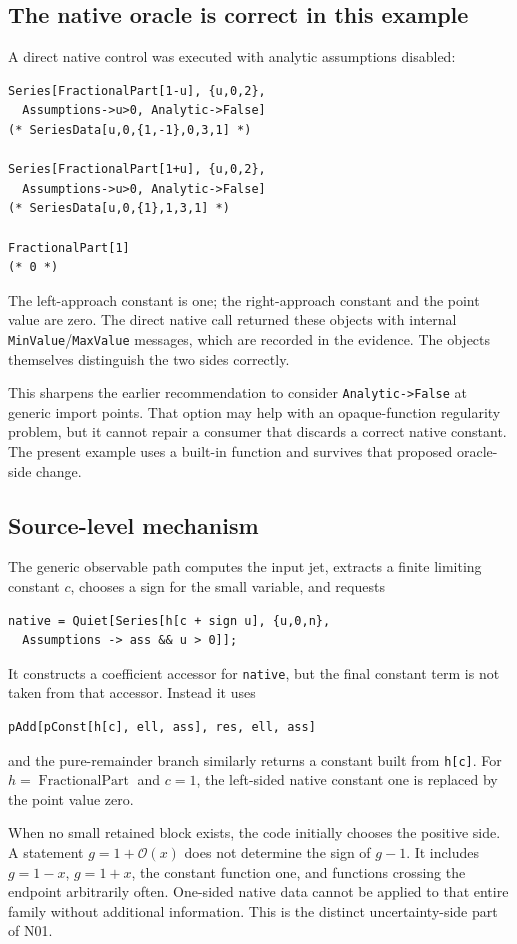\documentclass[11pt,letterpaper]{article}
\newcommand{\code}[1]{\nolinkurl{#1}}
\newcommand{\OO}{\mathcal{O}}
\begin{document}
\subsection{The native oracle is correct in this example}
A direct native control was executed with analytic assumptions disabled:
\begin{lstlisting}
Series[FractionalPart[1-u], {u,0,2},
  Assumptions->u>0, Analytic->False]
(* SeriesData[u,0,{1,-1},0,3,1] *)

Series[FractionalPart[1+u], {u,0,2},
  Assumptions->u>0, Analytic->False]
(* SeriesData[u,0,{1},1,3,1] *)

FractionalPart[1]
(* 0 *)
\end{lstlisting}
The left-approach constant is one; the right-approach constant and the point
value are zero. The direct native call returned these objects with internal
\code{MinValue}/\code{MaxValue} messages, which are recorded in the evidence.
The objects themselves distinguish the two sides correctly.

This sharpens the earlier recommendation to consider \code{Analytic->False}
at generic import points. That option may help with an opaque-function
regularity problem, but it cannot repair a consumer that discards a correct
native constant. The present example uses a built-in function and survives
that proposed oracle-side change.~\cite{r11,operations}

\subsection{Source-level mechanism}
The generic observable path computes the input jet, extracts a finite limiting
constant $c$, chooses a sign for the small variable, and requests
\begin{lstlisting}
native = Quiet[Series[h[c + sign u], {u,0,n},
  Assumptions -> ass && u > 0]];
\end{lstlisting}
It constructs a coefficient accessor for \code{native}, but the final constant
term is not taken from that accessor. Instead it uses
\begin{lstlisting}
pAdd[pConst[h[c], ell, ass], res, ell, ass]
\end{lstlisting}
and the pure-remainder branch similarly returns a constant built from
\code{h[c]}. For $h=\operatorname{FractionalPart}$ and $c=1$, the left-sided
native constant one is replaced by the point value zero.~\cite{operations}

When no small retained block exists, the code initially chooses the positive
side. A statement $g=1+\OO(x)$ does not determine the sign of $g-1$. It includes
$g=1-x$, $g=1+x$, the constant function one, and functions crossing the endpoint
arbitrarily often. One-sided native data cannot be applied to that entire
family without additional information. This is the distinct uncertainty-side
part of N01.
\end{document}
